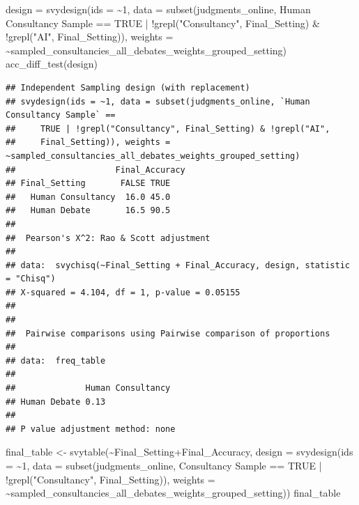 \documentclass[
]{article}
\newenvironment{Shaded}{\begin{snugshade}}{\end{snugshade}}
\newcommand{\AttributeTok}[1]{\textcolor[rgb]{0.77,0.63,0.00}{#1}}
\newcommand{\ConstantTok}[1]{\textcolor[rgb]{0.00,0.00,0.00}{#1}}
\newcommand{\DecValTok}[1]{\textcolor[rgb]{0.00,0.00,0.81}{#1}}
\newcommand{\FunctionTok}[1]{\textcolor[rgb]{0.00,0.00,0.00}{#1}}
\newcommand{\NormalTok}[1]{#1}
\newcommand{\OtherTok}[1]{\textcolor[rgb]{0.56,0.35,0.01}{#1}}
\newcommand{\SpecialCharTok}[1]{\textcolor[rgb]{0.00,0.00,0.00}{#1}}
\newcommand{\StringTok}[1]{\textcolor[rgb]{0.31,0.60,0.02}{#1}}
\begin{document}
\begin{Shaded}
\begin{Highlighting}[]
\NormalTok{design }\OtherTok{=} \FunctionTok{svydesign}\NormalTok{(}\AttributeTok{ids =} \SpecialCharTok{\textasciitilde{}}\DecValTok{1}\NormalTok{, }\AttributeTok{data =} \FunctionTok{subset}\NormalTok{(judgments\_online, }\StringTok{\textasciigrave{}}\AttributeTok{Human Consultancy Sample}\StringTok{\textasciigrave{}} \SpecialCharTok{==} \ConstantTok{TRUE} \SpecialCharTok{|} \SpecialCharTok{!}\FunctionTok{grepl}\NormalTok{(}\StringTok{"Consultancy"}\NormalTok{, Final\_Setting) }\SpecialCharTok{\&} \SpecialCharTok{!}\FunctionTok{grepl}\NormalTok{(}\StringTok{"AI"}\NormalTok{, Final\_Setting)), }\AttributeTok{weights =} \SpecialCharTok{\textasciitilde{}}\NormalTok{sampled\_consultancies\_all\_debates\_weights\_grouped\_setting)}
\FunctionTok{acc\_diff\_test}\NormalTok{(design)}
\end{Highlighting}
\end{Shaded}

\begin{verbatim}
## Independent Sampling design (with replacement)
## svydesign(ids = ~1, data = subset(judgments_online, `Human Consultancy Sample` == 
##     TRUE | !grepl("Consultancy", Final_Setting) & !grepl("AI", 
##     Final_Setting)), weights = ~sampled_consultancies_all_debates_weights_grouped_setting)
##                    Final_Accuracy
## Final_Setting       FALSE TRUE
##   Human Consultancy  16.0 45.0
##   Human Debate       16.5 90.5
## 
##  Pearson's X^2: Rao & Scott adjustment
## 
## data:  svychisq(~Final_Setting + Final_Accuracy, design, statistic = "Chisq")
## X-squared = 4.104, df = 1, p-value = 0.05155
## 
## 
##  Pairwise comparisons using Pairwise comparison of proportions 
## 
## data:  freq_table 
## 
##              Human Consultancy
## Human Debate 0.13             
## 
## P value adjustment method: none
\end{verbatim}

\begin{Shaded}
\begin{Highlighting}[]
\NormalTok{final\_table }\OtherTok{\textless{}{-}} \FunctionTok{svytable}\NormalTok{(}\SpecialCharTok{\textasciitilde{}}\NormalTok{Final\_Setting}\SpecialCharTok{+}\NormalTok{Final\_Accuracy, }
                        \AttributeTok{design =} \FunctionTok{svydesign}\NormalTok{(}\AttributeTok{ids =} \SpecialCharTok{\textasciitilde{}}\DecValTok{1}\NormalTok{, }
                                           \AttributeTok{data =} \FunctionTok{subset}\NormalTok{(judgments\_online, }\StringTok{\textasciigrave{}}\AttributeTok{Consultancy Sample}\StringTok{\textasciigrave{}} \SpecialCharTok{==} \ConstantTok{TRUE} \SpecialCharTok{|} \SpecialCharTok{!}\FunctionTok{grepl}\NormalTok{(}\StringTok{"Consultancy"}\NormalTok{, Final\_Setting)),}
                                           \AttributeTok{weights =} \SpecialCharTok{\textasciitilde{}}\NormalTok{sampled\_consultancies\_all\_debates\_weights\_grouped\_setting))}
\NormalTok{final\_table}
\end{Highlighting}
\end{Shaded}
\end{document}
